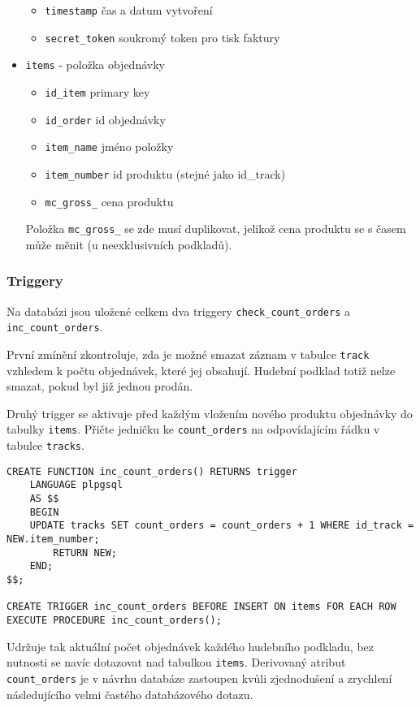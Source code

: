 \documentclass[12pt]{article}
\begin{document}
\begin{itemize}
\begin{itemize}
  \item{\texttt{timestamp}} čas a datum vytvoření
  \item{\texttt{secret\_token}} soukromý token pro tisk faktury
  \end{itemize}
\item{\texttt{items}} - položka objednávky
  \begin{itemize}
  \item{\texttt{id\_item}} primary key
  \item{\texttt{id\_order}} id objednávky
  \item{\texttt{item\_name}} jméno položky
  \item{\texttt{item\_number}} id produktu (stejné jako id\_track)
  \item{\texttt{mc\_gross\_}} cena produktu
  \end{itemize}
  Položka \texttt{mc\_gross\_} se zde musí duplikovat, jelikož cena produktu se s časem může měnit (u neexklusivních podkladů).
\end{itemize}

\subsubsection{Triggery}

Na databázi jsou uložené celkem dva triggery \texttt{check\_count\_orders} a \texttt{inc\_count\_orders}.\newline

První zmínění zkontroluje, zda je možné smazat záznam v tabulce \texttt{track} vzhledem k počtu objednávek, které jej obsahují. Hudební podklad totiž nelze smazat, pokud byl již jednou prodán.\newline

Druhý trigger se aktivuje před každým vložením nového produktu objednávky do tabulky \texttt{items}. Přičte jedničku ke \texttt{count\_orders} na odpovídajícím řádku v tabulce \texttt{tracks}.

\lstset{language=PL/I}
\begin{lstlisting}
CREATE FUNCTION inc_count_orders() RETURNS trigger
    LANGUAGE plpgsql
    AS $$
    BEGIN
	UPDATE tracks SET count_orders = count_orders + 1 WHERE id_track = NEW.item_number;
        RETURN NEW;
    END;
$$;

CREATE TRIGGER inc_count_orders BEFORE INSERT ON items FOR EACH ROW EXECUTE PROCEDURE inc_count_orders();
\end{lstlisting}

Udržuje tak aktuální počet objednávek každého hudebního podkladu, bez nutnosti se navíc dotazovat nad tabulkou \texttt{items}.
Derivovaný atribut \texttt{count\_orders} je v návrhu databáze zastoupen kvůli zjednodušení a zrychlení následujícího velmi častého databázového dotazu.
\end{document}
